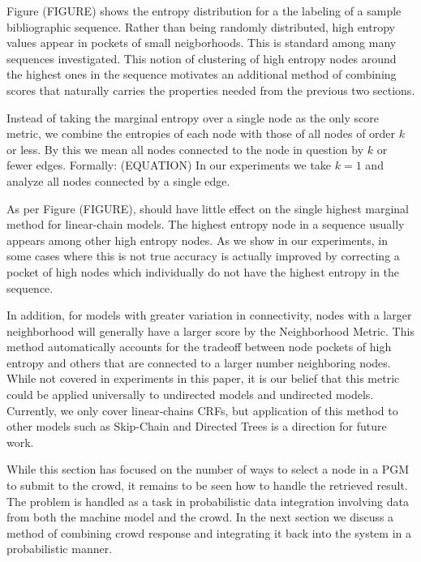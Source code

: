 Figure (FIGURE) shows the entropy distribution for a the labeling of a sample bibliographic sequence.  Rather than being randomly distributed, high entropy values appear in pockets of small neigborhoods.  This is standard among many sequences investigated.  This notion of clustering of high entropy nodes around the highest ones in the sequence motivates an additional method of combining scores that naturally carries the properties needed from the previous two sections.

Instead of taking the marginal entropy over a single node as the only score metric, we combine the entropies of each node with those of all nodes of order $k$ or less.  By this we mean all nodes connected to the node in question by $k$ or fewer edges.  Formally:
(EQUATION)
In our experiments we take $k=1$ and analyze all nodes connected by a single edge.  

As per Figure (FIGURE), should have little effect on the single highest marginal method for linear-chain models.  The highest entropy node in a sequence usually appears among other high entropy nodes.  As we show in our experiments, in some cases where this is not true accuracy is actually improved by correcting a pocket of high nodes which individually do not have the highest entropy in the sequence.

In addition, for models with greater variation in connectivity, nodes with a larger neighborhood will generally have a larger score by the Neighborhood Metric.  This method automatically accounts for the tradeoff between node pockets of high entropy and others that are connected to a larger number neighboring nodes.  While not covered in experiments in this paper, it is our belief that this metric could be applied universally to undirected models and undirected models.  Currently, we only cover linear-chains CRFs, but application of this method to other models such as Skip-Chain and Directed Trees is a direction for future work.

While this section has focused on the number of ways to select a node in a PGM to submit to the crowd, it remains to be seen how to handle the retrieved result.  The problem is handled as a task in probabilistic data integration involving data from both the machine model and the crowd.  In the next section we discuss a method of combining crowd response and integrating it back into the system in a probabilistic manner.
